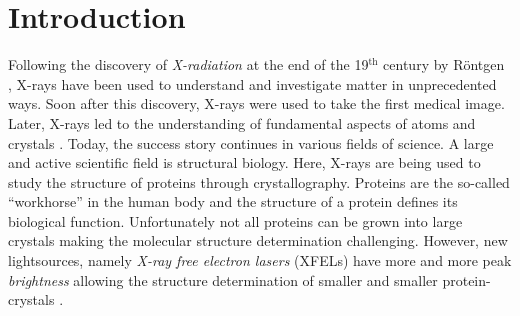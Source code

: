 \chapter{Introduction}
Following the discovery of \textit{X-radiation} at the end of the 19$^{\text{th}}$ century by R\"ontgen \cite{Roentgen-NP}, X-rays have been used to understand and investigate matter in unprecedented ways. Soon after this discovery, X-rays were used to take the first medical image. Later, X-rays led to the understanding of fundamental aspects of atoms \citep{Siegbahn-NP} and crystals \citep{Laue-NP,Bragg-NP}. Today, the success story continues in various fields of science. A large and active scientific field is structural biology. Here, X-rays are being used to study the structure of proteins through crystallography. Proteins are the so-called ``workhorse'' in the human body and the structure of a protein defines its biological function. Unfortunately not all proteins can be grown into large crystals making the molecular structure determination challenging. However, new lightsources, namely \textit{X-ray free electron lasers} (XFELs) \citep{Ackermann-2007-NPho} have more and more peak \textit{brightness} allowing the structure determination of smaller and smaller protein-crystals \citep{Chapman-2011-Nature}.\\[1\baselineskip]
